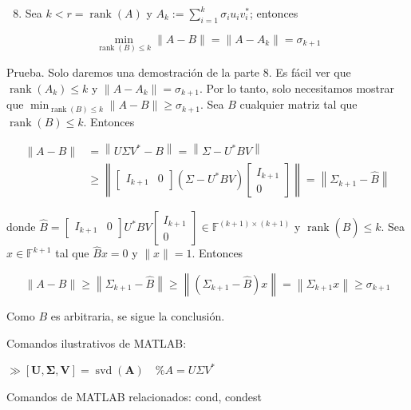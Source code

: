 \documentclass[11pt]{article}
\begin{document}
\begin{enumerate}
  \setcounter{enumi}{7}
  \item Sea $k<r=\operatorname{rank}(A)$ y $A_{k}:=\sum_{i=1}^{k} \sigma_{i} u_{i} v_{i}^{*}$; entonces
\end{enumerate}

$$
\min _{\operatorname{rank}(B) \leq k}\|A-B\|=\left\|A-A_{k}\right\|=\sigma_{k+1}
$$

Prueba. Solo daremos una demostración de la parte 8. Es fácil ver que $\operatorname{rank}\left(A_{k}\right) \leq k$ y $\left\|A-A_{k}\right\|=\sigma_{k+1}$. Por lo tanto, solo necesitamos mostrar que $\min _{\operatorname{rank}(B) \leq k}\|A-B\| \geq \sigma_{k+1}$. Sea $B$ cualquier matriz tal que $\operatorname{rank}(B) \leq k$. Entonces

$$
\begin{aligned}
\|A-B\| & =\left\|U \Sigma V^{*}-B\right\|=\left\|\Sigma-U^{*} B V\right\| \\
& \geq\left\|\left[\begin{array}{ll}
I_{k+1} & 0
\end{array}\right]\left(\Sigma-U^{*} B V\right)\left[\begin{array}{c}
I_{k+1} \\
0
\end{array}\right]\right\|=\left\|\Sigma_{k+1}-\hat{B}\right\|
\end{aligned}
$$

donde $\hat{B}=\left[\begin{array}{ll}I_{k+1} & 0\end{array}\right] U^{*} B V\left[\begin{array}{c}I_{k+1} \\ 0\end{array}\right] \in \mathbb{F}^{(k+1) \times(k+1)}$ y $\operatorname{rank}(\hat{B}) \leq k$. Sea $x \in \mathbb{F}^{k+1}$ tal que $\hat{B} x=0$ y $\|x\|=1$. Entonces

$$
\|A-B\| \geq\left\|\Sigma_{k+1}-\hat{B}\right\| \geq\left\|\left(\Sigma_{k+1}-\hat{B}\right) x\right\|=\left\|\Sigma_{k+1} x\right\| \geq \sigma_{k+1}
$$

Como $B$ es arbitraria, se sigue la conclusión.

Comandos ilustrativos de MATLAB:

$\gg[\mathbf{U}, \boldsymbol{\Sigma}, \mathbf{V}]=\operatorname{svd}(\mathbf{A}) \quad \% A=U \Sigma V^{*}$

Comandos de MATLAB relacionados: cond, condest
\end{document}
